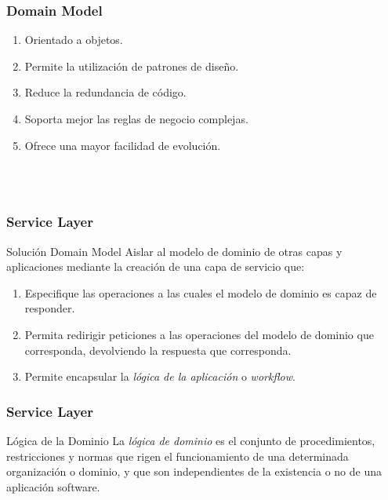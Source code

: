 \documentclass[a4paper,slidestop,xcolor=pst,dvips,blue]{beamer}
\begin{document}
\begin{frame}[c]
    \frametitle{Domain Model}
    \begin{enumerate}
        \item<2-> Orientado a objetos.
        \item<3-> Permite la utilización de patrones de diseño.
        \item<4-> Reduce la redundancia de código.
        \item<5-> Soporta mejor las reglas de negocio complejas.
        \item<6-> Ofrece una mayor facilidad de evolución.
    \end{enumerate}
    \ \\ \ \\
\end{frame}

\begin{frame}[c]
    \frametitle{Service Layer}
    \begin{block}{Solución Domain Model}
        Aislar al modelo de dominio de otras capas y aplicaciones mediante la creación de una capa de servicio que:
        \begin{enumerate}
            \item Especifique las operaciones a las cuales el modelo de dominio es capaz de responder.
            \item Permita redirigir peticiones a las operaciones del modelo de dominio que corresponda, devolviendo la respuesta que corresponda.
            \item Permite encapsular la \emph{lógica de la aplicación} o \emph{workflow}.
        \end{enumerate}
    \end{block}
\end{frame}

\begin{frame}[c]
    \frametitle{Service Layer}
    \begin{block}{Lógica de la Dominio}
        La \emph{lógica de dominio} es el conjunto de procedimientos, restricciones y normas que rigen el funcionamiento de una determinada organización o dominio, y que son independientes de la existencia o no de una aplicación software.
    \end{block}
\end{frame}
\end{document}
